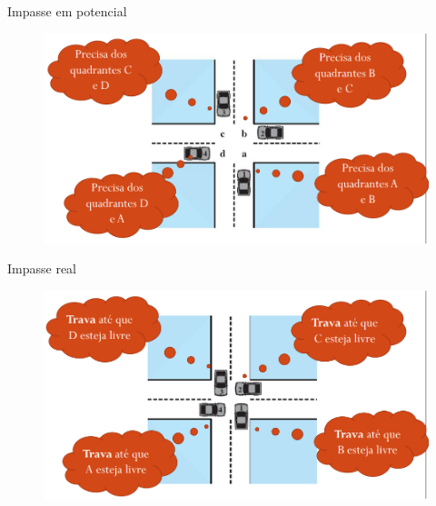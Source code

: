\documentclass[aspectratio=169,
				xcolor=table]{beamer}
\begin{document}
	\begin{frame}{Impasse em potencial}
		
		\begin{figure}
			\centering
			\includegraphics[keepaspectratio, height=0.75\paperheight]{../figs/cap07/potencial.png}			
		\end{figure}
	\end{frame}
	
	\begin{frame}{Impasse real}
		\begin{figure}
			\centering
			\includegraphics[keepaspectratio, height=0.75\paperheight]{../figs/cap07/real.png}			
		\end{figure}
		
	\end{frame}
		
\end{document}
